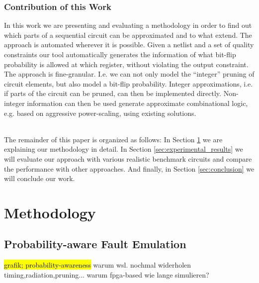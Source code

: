 \documentclass[conference]{IEEEtran}
\begin{document}
\subsubsection*{Contribution of this Work}
 In this work we are presenting and evaluating a methodology in order to find out which parts of a sequential circuit can be approximated and to what extend. The approach is automated wherever it is possible. Given a netlist and a set of quality constraints our tool automatically generates the information of what bit-flip probability is allowed at which register, without violating the output constraint. The approach is fine-granular. I.e. we can not only model the ``integer'' pruning of circuit elements, but also model a bit-flip probability. Integer approximations, i.e. if parts of the circuit can be pruned, can then be implemented directly. Non-integer information can then be used generate approximate combinational logic, e.g. based on aggressive power-scaling, using existing solutions.

\\
The remainder of this paper is organized as follows: In Section \ref{sec:methodology} we are explaining our methodology in detail. In Section \ref{sec:experimental_results} we will evaluate our approach with various realistic benchmark circuits and compare the performance with other approaches. And finally, in Section \ref{sec:conclusion} we will conclude our work. 





\section{Methodology}
\label{sec:methodology}
\subsection{Probability-aware Fault Emulation}
\hl{grafik; probability-awareness}
warum wsl. nochmal widerholen timing,radiation,pruning...
warum fpga-based
wie lange simulieren?
\end{document}
